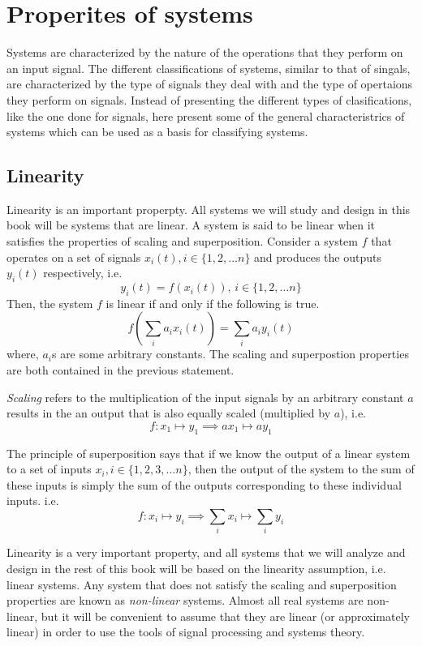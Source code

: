 \section{Properites of systems}
Systems are characterized by the nature of the operations that they perform on an input signal. The different classifications of systems, similar to that of singals, are characterized by the type of signals they deal with and the type of opertaions they perform on signals. Instead of presenting the different types of clasifications, like the one done for signals, here present some of the general characteristrics of systems which can be used as a basis for classifying systems.

\subsection{Linearity}
Linearity is an important properpty. All systems we will study and design in this book will be systems that are linear. A system is said to be linear when it satisfies the properties of scaling and superposition. Consider a system $f$ that operates on a set of signals $x_{i}\left(t\right), i \in \{1, 2, \dotsc n\}$ and produces the outputs $y_{i}\left(t\right)$ respectively, i.e.
\[ y_{i}\left(t\right) = f\left(x_{i}\left(t\right)\right), \, i \in \{1, 2, \dotsc n\} \]
Then, the system $f$ is linear if and only if the following is true.
\[ f\left(\sum_{i} a_{i}x_{i}\left(t\right)\right) = \sum_{i}a_{i}y_{i}\left(t\right) \]
where, $a_i$s are some arbitrary constants. The scaling and superpostion properties are both contained in the previous statement. 

\textit{Scaling} refers to the multiplication of the input signals by an arbitrary constant $a$ results in the an output that is also equally scaled (multiplied by $a$), i.e. 
\[ f: x_1 \mapsto y_1 \implies ax_1 \mapsto ay_1 \]

The principle of superposition says that if we know the output of a linear system to a set of inputs $x_{i}, i \in \{1, 2, 3, \dotsc n\}$, then the output of the system to the sum of these inputs is simply the sum of the outputs corresponding to these individual inputs. i.e.
\[ f: x_{i} \mapsto y_{i} \implies \sum_{i} x_{i} \mapsto \sum_{i} y_{i} \]

Linearity is a very important property, and all systems that we will analyze and design in the rest of this book will be based on the linearity assumption, i.e. linear systems. Any system that does not satisfy the scaling and superposition properties are known as \textit{non-linear} systems. Almost all real systems are non-linear, but it will be convenient to assume that they are linear (or approximately linear) in order to use the tools of signal processing and systems theory.

